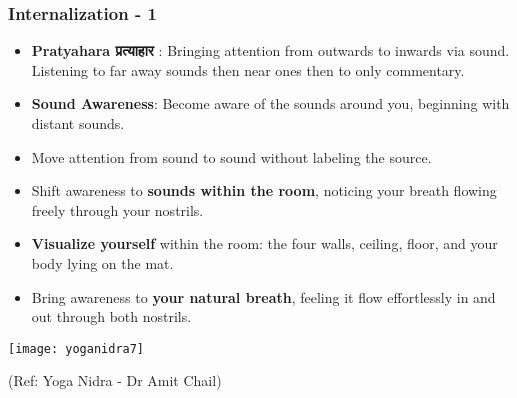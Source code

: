 \begin{frame}[fragile]\frametitle{Internalization - 1}
    \begin{itemize}
		\item \textbf{Pratyahara प्रत्याहार }: Bringing attention from outwards to inwards via sound. Listening to far away sounds then near ones then to only commentary.
        \item \textbf{Sound Awareness}: Become aware of the sounds around you, beginning with distant sounds. 
        \item Move attention from sound to sound without labeling the source.
        \item Shift awareness to \textbf{sounds within the room}, noticing your breath flowing freely through your nostrils.
        \item \textbf{Visualize yourself} within the room: the four walls, ceiling, floor, and your body lying on the mat.
        \item Bring awareness to \textbf{your natural breath}, feeling it flow effortlessly in and out through both nostrils.
    \end{itemize}
	
      \begin{center}
        \texttt{[image: yoganidra7]}

		{\tiny (Ref: Yoga Nidra - Dr Amit Chail)}		
        \end{center}		
\end{frame}



